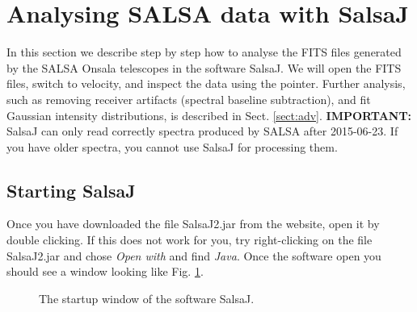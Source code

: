 \documentclass[11pt,a4paper]{article}
\begin{document}
\section{Analysing SALSA data with SalsaJ}
\label{sec:salsaj}
In this section we describe step by step how to analyse the FITS files
generated by the SALSA Onsala telescopes in the software SalsaJ. We will
open the FITS files, switch to velocity, and inspect the data using the
pointer. Further analysis, such as removing receiver artifacts 
(spectral baseline subtraction), and fit Gaussian intensity distributions,
is described in Sect. \ref{sect:adv}.
\textbf{IMPORTANT:} SalsaJ can only read correctly spectra produced by SALSA after
2015-06-23.  If you have older spectra, you cannot use SalsaJ for processing
them.

\subsection{Starting SalsaJ}
Once you have downloaded the file SalsaJ2.jar from the website, 
open it by double clicking. If this does not work for you, 
try right-clicking on the file SalsaJ2.jar and chose \emph{Open with}
and find \emph{Java}. Once the software open you should see a window looking
like Fig. \ref{fig:salsajstart}.
\begin{figure}[h!]
  \centering
  \caption{The startup window of the software SalsaJ.}
  \label{fig:salsajstart}
\end{figure}
\end{document}
